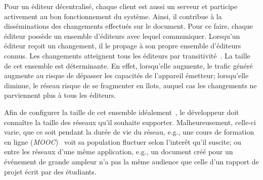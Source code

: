 Pour un éditeur décentralisé, chaque client est aussi un serveur et participe
activement au bon fonctionnement du système. Ainsi, il contribue à la
disséminations des changements effectués sur le document. Pour ce faire, chaque
éditeur possède un ensemble d'éditeurs avec lequel communiquer. Lorsqu'un
éditeur reçoit un changement, il le propage à son propre ensemble d'éditeurs
connus. Les changements atteignent tous les éditeurs par
transitivité~\cite{birman1999bimodal}. La taille de cet ensemble est
déterminante. En effet, lorsqu'elle augmente, le trafic généré augmente au
risque de dépasser les capacités de l'appareil émetteur; lorsqu'elle diminue, le
réseau risque de se fragmenter en îlots, auquel cas les changements ne
parviennent plus à tous les éditeurs.

Afin de configurer la taille de cet ensemble idéalement~\cite{erdos1959random},
le développeur doit connaître la taille des réseaux qu'il souhaite
supporter. Malheureusement, celle-ci varie, que ce soit pendant la durée de vie
du réseau, e.g., une cours de formation en ligne
(\emph{MOOC})~\cite{breslow2013studying} voit sa population fluctuer selon
l'interêt qu'il suscite; ou entre les réseaux d'une même application, e.g., un
document créé pour un événement de grande ampleur n'a pas la même audience que
celle d'un rapport de projet écrit par des étudiants.



